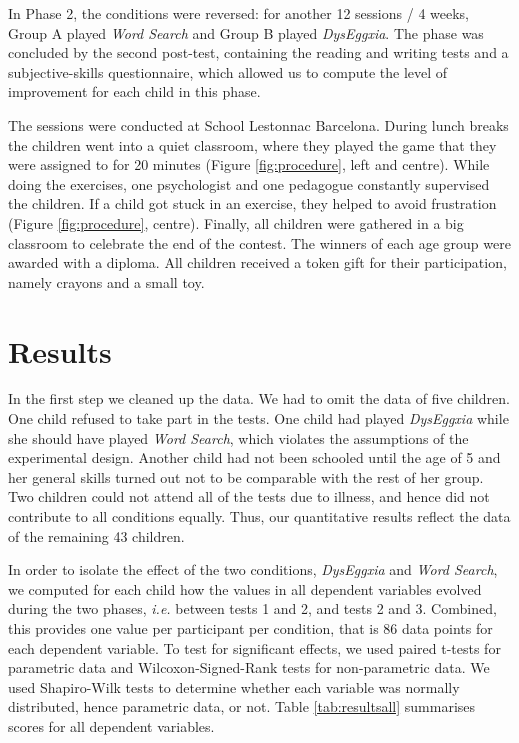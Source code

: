 \documentclass[letterpaper]{sig-alternate-2013}
\begin{document}
In Phase 2, the conditions were reversed: for another 12 sessions / 4 weeks, Group A played {\it Word Search} and Group B played {\it DysEggxia}. The phase was concluded by the second post-test, containing the reading and writing tests and a subjective-skills questionnaire, which allowed us to compute the level of improvement for each child in this phase.

The sessions were conducted at School Lestonnac Barcelona. During lunch breaks the children went into a quiet classroom, where they played the game that they were assigned to for 20 minutes (Figure \ref{fig:procedure}, left and centre). While doing the exercises, one psychologist and one pedagogue constantly supervised the children. If a child got stuck in an exercise, they helped to avoid frustration (Figure \ref{fig:procedure}, centre). Finally, all children were gathered in a big classroom to celebrate the end of the contest. The winners of each age group were awarded with a diploma. All children received a token gift for their participation, namely crayons and a small toy. 



\section{Results}
In the first step we cleaned up the data. We had to omit the data of five children. One child refused to take part in the tests. One child had played {\it DysEggxia} while she should have played {\it Word Search}, which violates the assumptions of the experimental design. Another child had not been schooled until the age of 5 and her general skills turned out not to be comparable with the rest of her group. Two children could not attend all of the tests due to illness, and hence did not contribute to all conditions equally. Thus, our quantitative results reflect the data of the remaining 43 children.

In order to isolate the effect of the two conditions, {\it DysEggxia} and {\it Word Search}, we computed for each child how the values in all dependent variables evolved during the two phases, \emph{i.e.} between tests 1 and 2, and tests 2 and 3. 
Combined, this provides one value per participant per condition, that is 86 data points for each dependent variable. To test for significant effects, we used paired t-tests for parametric data and Wilcoxon-Signed-Rank tests for non-parametric data. We used Shapiro-Wilk tests to determine whether each variable was normally distributed, hence parametric data, or not. Table \ref{tab:resultsall} summarises scores for all dependent variables.
\end{document}
